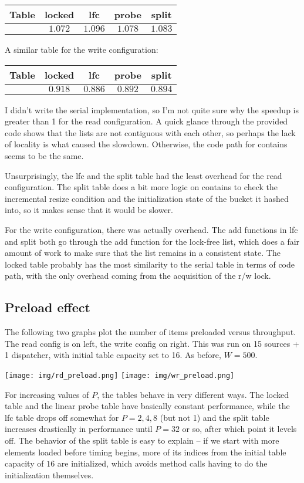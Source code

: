 \documentclass{article}
\begin{document}
\begin{tabular}{c|cccc}
    Table&locked&lfc&probe&split\\
    \hline
         &$1.072$&$1.096$&$1.078$&$1.083$\\
\end{tabular}

A similar table for the write configuration:

\begin{tabular}{c|cccc}
    Table&locked&lfc&probe&split\\
    \hline
         &$0.918$&$0.886$&$0.892$&$0.894$\\
\end{tabular}

I didn't write the serial implementation, so I'm not quite sure why the speedup is greater than 1 for the read configuration. A quick glance through the provided code shows that the lists are not contiguous with each other, so perhaps the lack of locality is what caused the slowdown. Otherwise, the code path for contains seems to be the same. 

Unsurprisingly, the lfc and the split table had the least overhead for the read configuration. The split table does a bit more logic on contains to check the incremental resize condition and the initialization state of the bucket it hashed into, so it makes sense that it would be slower.

For the write configuration, there was actually overhead. The add functions in lfc and split both go through the add function for the lock-free list, which does a fair amount of work to make sure that the list remains in a consistent state. The locked table probably has the most similarity to the serial table in terms of code path, with the only overhead coming from the acquisition of the r/w lock. 
\subsection*{Preload effect}
The following two graphs plot the number of items preloaded versus throughput. The read config is on left, the write config on right. This was run on 15 sources + 1 dispatcher, with initial table capacity set to 16. As before, $W=500$.

\texttt{[image: img/rd\_preload.png]}
\texttt{[image: img/wr\_preload.png]}

For increasing values of $P$, the tables behave in very different ways. The locked table and the linear probe table have basically constant performance, while the lfc table drops off somewhat for $P=2,4,8$ (but not 1) and the split table increases drastically in performance until $P=32$ or so, after which point it levels off. The behavior of the split table is easy to explain -- if we start with more elements loaded before timing begins, more of its indices from the initial table capacity of $16$ are initialized, which avoids method calls having to do the initialization themselves. 
\end{document}
